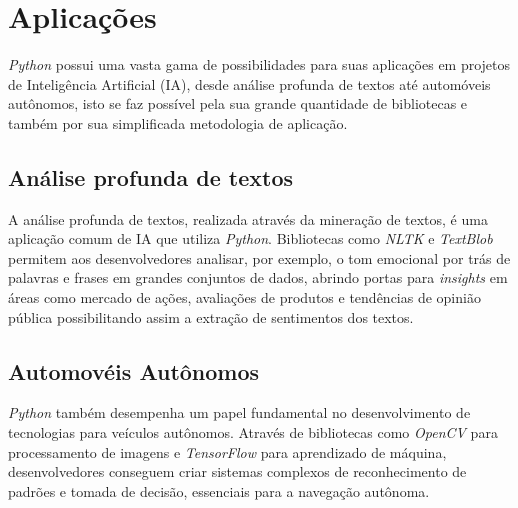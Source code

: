 \chapter{Aplicações}

\textit{Python} possui uma vasta gama de possibilidades para suas aplicações em projetos de Inteligência Artificial (IA), desde análise profunda de textos até automóveis autônomos, isto se faz possível pela sua grande quantidade de bibliotecas e também por sua simplificada metodologia de aplicação.\cite{didatica2024}

\section{Análise profunda de textos}

A análise profunda de textos, realizada através da mineração de textos, é uma aplicação comum de IA que utiliza \textit{Python}. Bibliotecas como \textit{NLTK} e \textit{TextBlob} permitem aos desenvolvedores analisar, por exemplo, o tom emocional por trás de palavras e frases em grandes conjuntos de dados, abrindo portas para \textit{insights} em áreas como mercado de ações, avaliações de produtos e tendências de opinião pública possibilitando assim a extração de sentimentos dos textos.\cite{didatica2024}

\section{Automovéis Autônomos}

\textit{Python} também desempenha um papel fundamental no desenvolvimento de tecnologias para veículos autônomos. Através de bibliotecas como \textit{OpenCV} para processamento de imagens e \textit{TensorFlow} para aprendizado de máquina, desenvolvedores conseguem criar sistemas complexos de reconhecimento de padrões e tomada de decisão, essenciais para a navegação autônoma.\cite{didatica2024}